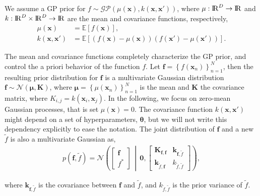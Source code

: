 \documentclass[onecolumn,a4paper,11pt]{article}
\begin{document}
We assume a GP prior for $f \sim \mathcal{GP}(\mu(\bm{x}), k(\bm{x}, \bm{x}'))$, where $\mu: {\rm I\!R}^D \rightarrow {\rm I\!R}$ and $k: {\rm I\!R}^D \times {\rm I\!R}^D \rightarrow {\rm I\!R}$ are the mean and covariance functions, respectively,
%
\begin{align*}
 	\mu(\bm{x}) &= \mathbb{E}\!\left[f(\bm{x})\right],\\ 
 	k(\bm{x}, \bm{x}') &= \mathbb{E}\!\left[\left( f(\bm{x}) - \mu(\bm{x}) \right)\left( f(\bm{x}') - \mu(\bm{x}') \right)\right].
\end{align*} 

The mean and covariance functions completely characterize the GP prior, and control the a priori behavior of the function $f$. Let $\bm{f}=\left\lbrace f(\bm{x}_n) \right\rbrace_{n=1}^N$, then the resulting prior distribution for $\bm{f}$ is a multivariate Gaussian distribution
$\bm{f} \sim \mathcal{N}(\bm{\mu}, \bm{K})$,
 where $\bm{\mu} = \left\lbrace \mu(\bm{x}_n) \right\rbrace_{n=1}^N$ is the mean and $\bm{K}$ the covariance matrix, where $K_{i,j}=k(\bm{x}_i,\bm{x}_j)$. In the following, we focus on zero-mean Gaussian processes, that is set $\mu(\bm{x}) = 0$. The covariance function $k(\bm{x}, \bm{x}')$ might depend on a set of hyperparameters, $\bm{\theta}$, but we will not write this dependency explicitly to ease the notation.
The joint distribution of $\bm{f}$ and a new $\tilde{f}$ is also a multivariate Gaussian as,
%
\begin{align*}
p(\bm{f}, \tilde{f})=\mathcal{N} \left( \left[ \begin{array}{cc}
\bm{f} \\ 
f^*
\end{array} \right] \,\middle|\, \bm{0},\left[ \begin{array}{cc}
\bm{K}_{\bm{f},\bm{f}} & \bm{k}_{\bm{f},\tilde{f}} \\ 
\bm{k}_{\tilde{f},\bm{f}} & k_{\tilde{f},\tilde{f}}
\end{array} \right] \right),
\end{align*} 

\noindent where $\bm{k}_{\bm{f},\tilde{f}}$ is the covariance between $\bm{f}$ and $\tilde{f}$, and $k_{\tilde{f},\tilde{f}}$ is the prior variance of $\tilde{f}$. %
\end{document}
